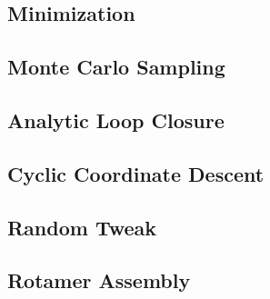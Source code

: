 \subsection{Minimization}
\label{subsection:minimization}


\subsection{Monte Carlo Sampling}
\label{subsection:monte_carlo}


\subsection{Analytic Loop Closure}
\label{subsection:analytic_loop_closure}


\subsection{Cyclic Coordinate Descent}
\label{subsection:cyclic_coordinate_descent}


\subsection{Random Tweak}
\label{subsection:tweak}


\subsection{Rotamer Assembly}
\label{subsection:rotamer_assembly}

